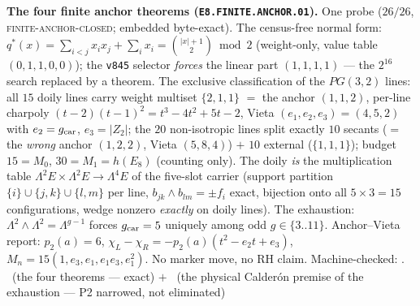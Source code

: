 \par\smallskip\noindent\textbf{The four finite anchor theorems
(\texttt{E8.FINITE.\allowbreak ANCHOR.01}).}
One probe ($26/26$, \textsc{finite-anchor-closed}; embedded
byte-exact).  The census-free normal form: $q^{*}(x) = \sum_{i<j}
x_i x_j + \sum_i x_i = \binom{|x|+1}{2} \bmod 2$ (weight-only,
value table $(0,1,1,0,0)$); the \texttt{v845} selector
\emph{forces} the linear part $(1,1,1,1)$ --- the $2^{16}$ search
replaced by a theorem.  The exclusive classification of the
$PG(3,2)$ lines: all $15$ doily lines carry weight multiset
$\{2,1,1\}$ $=$ the anchor $(1,1,2)$, per-line charpoly
$(t-2)(t-1)^2 = t^3 - 4t^2 + 5t - 2$, Vieta $(e_1,e_2,e_3) =
(4,5,2)$ with $e_2 = g_{\mathrm{car}}$, $e_3 = |Z_2|$; the $20$
non-isotropic lines split exactly $10$ secants ($=$ the
\emph{wrong} anchor $(1,2,2)$, Vieta $(5,8,4)$) $+$ $10$ external
($\{1,1,1\}$); budget $15 = M_0$, $30 = M_1 = h(E_8)$ (counting
only).  The doily \emph{is} the multiplication table $\Lambda^2 E
\times \Lambda^2 E \to \Lambda^4 E$ of the five-slot carrier
(support partition $\{i\} \cup \{j,k\} \cup \{l,m\}$ per line,
$b_{jk} \wedge b_{lm} = \pm f_i$ exact, bijection onto all
$5\times3 = 15$ configurations, wedge nonzero \emph{exactly} on
doily lines).  The exhaustion: $\Lambda^2 \wedge \Lambda^2 =
\Lambda^{g-1}$ forces $g_{\mathrm{car}} = 5$ uniquely among odd $g \in
\{3..11\}$.  Anchor--Vieta report: $p_2(a) = 6$, $\chi_L -
\chi_R = -p_2(a)(t^2 - e_2 t + e_3)$, $M_n = 15(1, e_3, e_1,
e_1 e_3, e_1^2)$.  No marker move, no RH claim.
Machine-checked: .
\mE\ (the four theorems --- exact) $+$ \mO\ (the physical
Calder\'on premise of the exhaustion --- P2 narrowed, not
eliminated)
\par\smallskip

